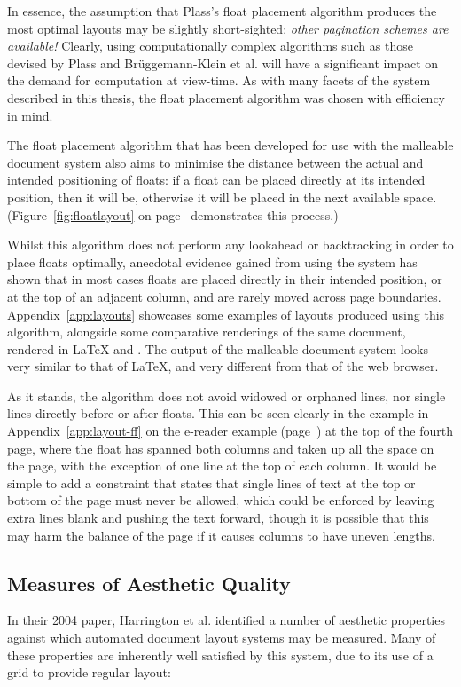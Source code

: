 In essence, the assumption that Plass's float placement algorithm produces the most optimal layouts may be slightly short-sighted: \emph{other pagination schemes are available!} Clearly, using computationally complex algorithms such as those devised by Plass and Br\"uggemann-Klein et al. will have a significant impact on the demand for computation at view-time. As with many facets of the system described in this thesis, the float placement algorithm was chosen with efficiency in mind.

The float placement algorithm that has been developed for use with the malleable document system also aims to minimise the distance between the actual and intended positioning of floats: if a float can be placed directly at its intended position, then it will be, otherwise it will be placed in the next available space. (Figure~\ref{fig:floatlayout} on page~\pageref{fig:floatlayout} demonstrates this process.)

Whilst this algorithm does not perform any lookahead or backtracking in order to place floats optimally, anecdotal evidence gained from using the system has shown that in most cases floats are placed directly in their intended position, or at the top of an adjacent column, and are rarely moved across page boundaries. Appendix~\ref{app:layouts} showcases some examples of layouts produced using this algorithm, alongside some comparative renderings of the same document, rendered in \LaTeX{} and \html{}. The output of the malleable document system looks very similar to that of \LaTeX, and very different from that of the web browser.

As it stands, the algorithm does not avoid widowed or orphaned lines, nor single lines directly before or after floats. This can be seen clearly in the example in Appendix~\ref{app:layout-ff} on the e-reader example (page~\pageref{app:p:layout-ff-ereader}) at the top of the fourth page, where the float has spanned both columns and taken up all the space on the page, with the exception of one line at the top of each column. It would be simple to add a constraint that states that single lines of text at the top or bottom of the page must never be allowed, which could be enforced by leaving extra lines blank and pushing the text forward, though it is possible that this may harm the balance of the page if it causes columns to have uneven lengths.


\subsection{Measures of Aesthetic Quality}
\label{sec:aesthetic-quality}
In their 2004 paper, Harrington et al.\hspace{0pt}\cite{Harrington2004} identified a number of aesthetic properties against which automated document layout systems may be measured. Many of these properties are inherently well satisfied by this system, due to its use of a grid to provide regular layout:

